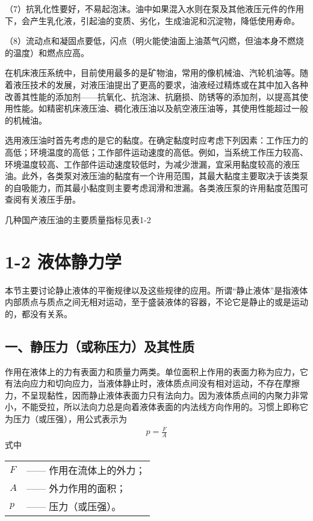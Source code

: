 （7）抗乳化性要好，不易起泡沫。油中如果混入水则在泵及其他液压元件的作用下，会产生乳化液，引起油的变质、劣化，生成油泥和沉淀物，降低使用寿命。
        
（8）流动点和凝固点要低，闪点（明火能使油面上油蒸气闪燃，但油本身不燃烧的温度）和燃点应高。

 在机床液压系统中，目前使用最多的是矿物油，常用的像机械油、汽轮机油等。随着液压技术的发展，对液压油提出了更高的要求，油液经过精炼或在其中加入各种改善其性能的添加剂——抗氧化、抗泡沫、抗磨损、防锈等的添加剂，以提高其使用性能。如精密机床液压油、稠化液压油以及航空液压油等，其使用性能超过一般的机械油。
         
选用液压油时首先考虑的是它的黏度。在确定黏度时应考虑下列因素：工作压力的高低；环境温度的高低；工作部件运动速度的高低。例如，当系统工作压力较高、环境温度较高、工作部件运动速度较低时，为减少泄漏，宜采用黏度较高的液压油。此外，各类泵对液压油的黏度有一个许用范围，其最大黏度主要取决于该类泵的自吸能力，而其最小黏度则主要考虑润滑和泄漏。各类液压泵的许用黏度范围可查阅有关液压手册。

几种国产液压油的主要质量指标见表1-2


   \newpage    
   \chapter*{1-2 液体静力学}    
   
   本节主要讨论静止液体的平衡规律以及这些规律的应用。所谓“静止液体”是指液体内部质点与质点之间无相对运动，至于盛装液体的容器，不论它是静止的或是运动的，都没有关系。
   \section*{一、静压力（或称压力）及其性质}
         作用在液体上的力有表面力和质量力两类。单位面积上作用的表面力称为应力，它有法向应力和切向应力，当液体静止时，液体质点间没有相对运动，不存在摩擦力，不呈现黏性，因而静止液体表面力只有法向力。因为液体质点间的内聚力非常小，不能受拉，所以法向力总是向着液体表面的内法线方向作用的。习惯上即称它为压力（或压强），用公式表示为
         \begin{gather}
            {p}={\frac{F}{A}}
        \end{gather}
\noindent 式中\ 
\begin{tabular}[t]{ll}
    $F$ & —— 作用在流体上的外力；\\
    $A$ & —— 外力作用的面积；\\
    $p$ & —— 压力（或压强）。 
   
\end{tabular}

